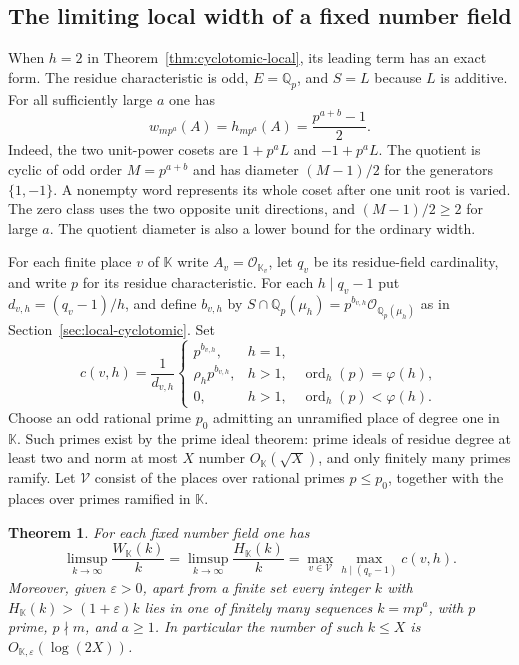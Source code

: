 \documentclass[11pt,letterpaper]{article}
\newtheorem{theorem}{Theorem}[section]
\theoremstyle{definition}
\numberwithin{equation}{section}
\begin{document}
\subsection{The limiting local width of a fixed number field}
\label{sec:local-signature}

When $h=2$ in Theorem~\ref{thm:cyclotomic-local}, its leading term
has an exact form. The residue characteristic is odd, $E=\mathbb Q_p$,
and $S=L$ because $L$ is additive. For all sufficiently large $a$
one has
\begin{equation}\label{eq:local-two-directions}
            w_{mp^a}(A)=h_{mp^a}(A)=\frac{p^{a+b}-1}{2}.
\end{equation}
Indeed, the two unit-power cosets are $1+p^aL$ and $-1+p^aL$.
The quotient is cyclic of odd order $M=p^{a+b}$ and has diameter
$(M-1)/2$ for the generators $\{1,-1\}$. A nonempty word represents
its whole coset after one unit root is varied. The zero class uses
the two opposite unit directions, and $(M-1)/2\ge2$ for large $a$.
The quotient diameter is also a lower bound for the ordinary width.

For each finite place $v$ of $\mathbb K$ write $A_v=\mathcal
O_{\mathbb K_v}$, let $q_v$ be its residue-field cardinality, and
write $p$ for its residue characteristic. For each $h\mid q_v-1$
put $d_{v,h}=(q_v-1)/h$, and define $b_{v,h}$ by
$S\cap\mathbb Q_p(\mu_h)=p^{b_{v,h}}\mathcal O_{\mathbb Q_p(\mu_h)}$
as in Section~\ref{sec:local-cyclotomic}. Set
\[
 c(v,h)=\frac{1}{d_{v,h}}
 \begin{cases}
       p^{b_{v,h}},& h=1,\\
       \rho_h p^{b_{v,h}},& h>1,\quad
                         \operatorname{ord}_h(p)=\varphi(h),\\
       0,&h>1,\quad \operatorname{ord}_h(p)<\varphi(h).
 \end{cases}
\]
Choose an odd rational prime $p_0$ admitting an unramified place of
degree one in $\mathbb K$. Such primes exist by the prime ideal theorem:
prime ideals of residue degree at least two and norm at most $X$
number $O_{\mathbb K}(\sqrt X)$, and only finitely many primes ramify.
Let $\mathcal V$ consist of the places over rational primes $p\le p_0$,
together with the places over primes ramified in $\mathbb K$.

\begin{theorem}\label{thm:local-signature}
For each fixed number field one has
\begin{equation}\label{eq:local-signature}
 \limsup_{k\to\infty}\frac{W_{\mathbb K}(k)}k
 =\limsup_{k\to\infty}\frac{H_{\mathbb K}(k)}k
 =\max_{v\in\mathcal V}\max_{h\mid(q_v-1)}c(v,h).
\end{equation}
Moreover, given $\varepsilon>0$, apart from a finite set every integer
$k$ with $H_{\mathbb K}(k)>(1+\varepsilon)k$ lies in one of finitely
many sequences $k=mp^a$, with $p$ prime, $p\nmid m$, and $a\ge1$.
In particular the number of such $k\le X$ is
$O_{\mathbb K,\varepsilon}(\log(2X))$.
\end{theorem}
\end{document}
